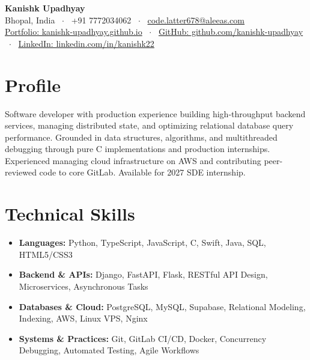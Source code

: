 \documentclass[10pt,a4paper]{article}
\begin{document}
\begin{center}
    {\huge \textbf{Kanishk Upadhyay}} \\ \vspace{2pt}
    Bhopal, India \ $\cdot$ \ +91 7772034062 \ $\cdot$ \ \href{mailto:code.latter678@aleeas.com}{code.latter678@aleeas.com} \\ \vspace{2pt}
    \href{https://kanishk-upadhyay.github.io/}{Portfolio: kanishk-upadhyay.github.io} \ $\cdot$ \ 
    \href{https://github.com/kanishk-upadhyay}{GitHub: github.com/kanishk-upadhyay} \ $\cdot$ \ 
    \href{https://linkedin.com/in/kanishk22}{LinkedIn: linkedin.com/in/kanishk22}
\end{center}

\vspace{-6pt}
\section{Profile}
Software developer with production experience building high-throughput backend services, managing distributed state, and optimizing relational database query performance. Grounded in data structures, algorithms, and multithreaded debugging through pure C implementations and production internships. Experienced managing cloud infrastructure on AWS and contributing peer-reviewed code to core GitLab. Available for 2027 SDE internship.

\section{Technical Skills}
\begin{itemize}
    \item \textbf{Languages:} Python, TypeScript, JavaScript, C, Swift, Java, SQL, HTML5/CSS3
    \item \textbf{Backend \& APIs:} Django, FastAPI, Flask, RESTful API Design, Microservices, Asynchronous Tasks
    \item \textbf{Databases \& Cloud:} PostgreSQL, MySQL, Supabase, Relational Modeling, Indexing, AWS, Linux VPS, Nginx
    \item \textbf{Systems \& Practices:} Git, GitLab CI/CD, Docker, Concurrency Debugging, Automated Testing, Agile Workflows
\end{itemize}
\end{document}
